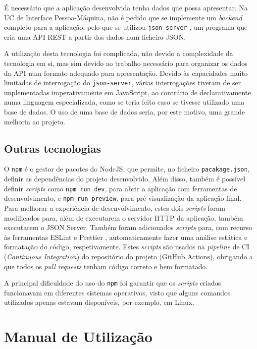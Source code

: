 \documentclass[12pt, a4paper]{article}
\begin{document}
É necessário que a aplicação desenvolvida tenha dados que possa apresentar. Na UC de Interface
Pessoa-Máquina, não é pedido que se implemente um \emph{backend} completo para a aplicação, pelo que
se utilizou \texttt{json-server} \cite{json-server}, um programa que cria uma API REST a partir dos
dados num ficheiro JSON.

A utilização desta tecnologia foi complicada, não devido a complexidade da tecnologia em si, mas sim
devido ao trabalho necessário para organizar os dados da API num formato adequado para apresentação.
Devido às capacidades muito limitadas de interrogação do \texttt{json-server}, várias interrogações
tiveram de ser implementadas imperativamente em JavaScript, ao contrário de declarativamente numa
linguagem especializada, como se teria feito caso se tivesse utilizado uma base de dados. O uso de
uma base de dados seria, por este motivo, uma grande melhoria ao projeto.

\subsection{Outras tecnologias}

O \texttt{npm} \cite{npm} é o gestor de pacotes do NodeJS, que permite, no ficheiro
\texttt{pacakage.json}, definir as dependências do projeto desenvolvido. Além disso, também é
possível definir \emph{scripts} como \texttt{npm run dev}, para abrir a aplicação com ferramentas de
desenvolvimento, e \texttt{npm run preview}, para pré-visualização da aplicação final. Para melhorar
a experiência de desenvolvimento, estes dois \emph{scripts} foram modificados para, além de
executarem o servidor HTTP da aplicação, também executarem o JSON Server. Também foram adicionados
\emph{scripts} para, com recurso às ferramentas ESLint \cite{eslint} e Prettier \cite{prettier},
automaticamente fazer uma análise estática e formatação do código, respetivamente. Estes
\emph{scripts} são usados na \emph{pipeline} de CI (\emph{Continuous Integration}) do repositório do
projeto (GitHub Actions), obrigando a que todos os \emph{pull requests} tenham código correto e bem
formatado.

A principal dificuldade do uso do \texttt{npm} foi garantir que os \emph{scripts} criados
funcionavam em diferentes sistemas operativos, visto que alguns comandos utilizados apenas estavam
disponíveis, por exemplo, em Linux.

\section{Manual de Utilização}
\label{user-manual}
\end{document}
